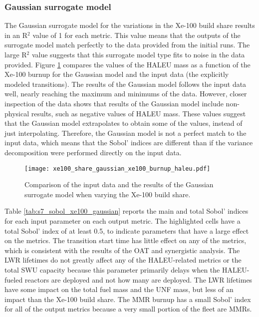 \subsubsection{Gaussian surrogate model}
The Gaussian surrogate model for the variations in the Xe-100 build 
share results in an R$^2$ value of 1 for each metric. This value 
means that the outputs of 
the surrogate model match perfectly to the data provided from the initial 
\Cyclus runs. The large R$^2$ value suggests that this surrogate model type 
fits to noise in the data provided. 
Figure \ref{fig:s7_xe100_gaussian} compares the values of the
\gls{HALEU} mass as a function of the Xe-100 burnup for the Gaussian model 
and the input data (the explicitly modeled transitions). The results of 
the Gaussian model follows the input 
data well, nearly reaching the maximum and minimums of the data. However, 
closer inspection of the data shows that results of the Gaussian model 
include non-physical results, such as negative values of \gls{HALEU} mass. 
These values suggest that the Gaussian model extrapolates to obtain 
some of the values, instead 
of just interpolating. Therefore, the Gaussian model is not a perfect 
match to the input data, which means that the Sobol' indices are different 
than if the variance decomposition were performed directly on the input 
data. 

\begin{figure}[h!]
    \centering 
    \texttt{[image: xe100\_share\_gaussian\_xe100\_burnup\_haleu.pdf]}
    \caption{Comparison of the input data and the results of the Gaussian 
    surrogate model when varying the Xe-100 build share.}
    \label{fig:s7_xe100_gaussian}
\end{figure}

Table \ref{tab:s7_sobol_xe100_gaussian} reports the main and total Sobol' indices 
for each input parameter on each output metric. The highlighted cells have 
a total Sobol' index of at least 0.5, to indicate parameters that have a large 
effect on the metrics. 
The transition start time 
has little effect on any of the metrics, which is consistent with the 
results of the \gls{OAT} and synergistic analysis. The \gls{LWR} lifetimes 
do not greatly affect any of the \gls{HALEU}-related metrics or the 
total \gls{SWU} capacity because this parameter primarily delays when 
the \gls{HALEU}-fueled reactors are deployed and not how many are deployed. 
The \gls{LWR} lifetimes have some impact on the total 
fuel mass and the \gls{UNF} mass, but less of an impact than the Xe-100 
build share. 
The \gls{MMR} burnup has a small Sobol' index for all of the output metrics
because a very small portion of the fleet are \glspl{MMR}. 

